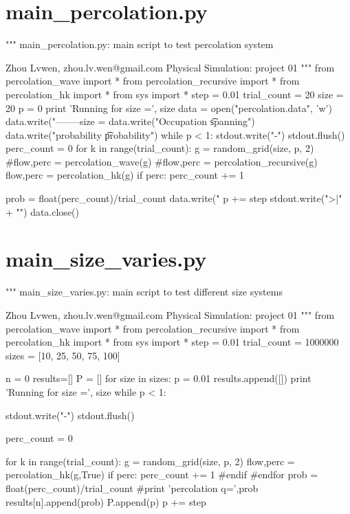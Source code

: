 \documentclass[11pt,a4paper,boxed]{caspset}
\begin{document}
\newpage
\appendix
\appendixpage
\begin{subappendices}
\section{main\_percolation.py}
{\scriptsize
\begin{python}
"""
main_percolation.py: main script to test percolation system

Zhou Lvwen, zhou.lv.wen@gmail.com
Physical Simulation: project 01
"""
from percolation_wave import *
from percolation_recursive import *
from percolation_hk import *
from sys import *
step = 0.01
trial_count = 20
size = 20
p = 0
print 'Running for size =', size
data = open("percolation.data", 'w')
data.write("--------size = %
data.write("Occupation \t spanning\n")
data.write("probability \t probability\n")
while p < 1:
    stdout.write("-")
    stdout.flush()
    perc_count = 0
    for k in range(trial_count):
        g = random_grid(size, p, 2)
        #flow,perc = percolation_wave(g)
        #flow,perc = percolation_recursive(g)
        flow,perc = percolation_hk(g)
        if perc:
           perc_count += 1

    prob = float(perc_count)/trial_count
    data.write("%
    p += step
stdout.write(">|" + "\n")
data.close()
\end{python}
}
\section{main\_size\_varies.py}
\begin{python}
"""
main_size_varies.py: main script to test different size systems

Zhou Lvwen, zhou.lv.wen@gmail.com
Physical Simulation: project 01
"""
from percolation_wave import *
from percolation_recursive import *
from percolation_hk import *
from sys import *
step = 0.01
trial_count = 1000000
sizes = [10, 25, 50, 75, 100]

n = 0
results=[]
P = []
for size in sizes:
    p = 0.01
    results.append([])
    print 'Running for size =', size
    while p < 1:

        stdout.write("-")
        stdout.flush()

        perc_count = 0

        for k in range(trial_count):
            g = random_grid(size, p, 2)
            flow,perc = percolation_hk(g,True)
            if perc:
                perc_count += 1
            #endif
        #endfor
        prob = float(perc_count)/trial_count
        #print 'percolation q=',prob
        results[n].append(prob)
        P.append(p)
        p += step


\end{python}
\end{subappendices}
\end{document}
